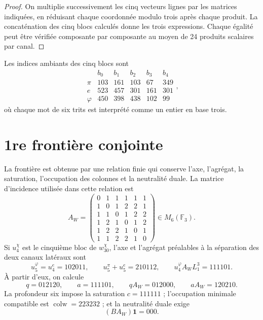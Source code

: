 \begin{proof}
On multiplie successivement les cinq vecteurs lignes par les matrices
indiquées, en réduisant chaque coordonnée modulo trois après chaque produit.
La concaténation des cinq blocs calculés donne les trois expressions.
Chaque égalité peut être vérifiée composante par composante au moyen de 24
produits scalaires par canal.
\end{proof}

Les indices ambiants des cinq blocs sont
\[
\begin{array}{c|rrrrr}
&b_0&b_1&b_2&b_3&b_4\\\hline
\pi&103&161&103&67&349\\
e&523&457&301&161&301\\
\varphi&450&398&438&102&99
\end{array},
\]
où chaque mot de six trits est interprété comme un entier en base trois.

\section{1re frontière conjointe}

La frontière est obtenue par une relation finie qui conserve l'axe, l'agrégat,
la saturation, l'occupation des colonnes et la neutralité duale. La matrice d'incidence
utilisée dans cette relation est
\begin{equation}
 A_W=
 \begin{pmatrix}
 0&1&1&1&1&1\\
 1&0&1&2&2&1\\
 1&1&0&1&2&2\\
 1&2&1&0&1&2\\
 1&2&2&1&0&1\\
 1&1&2&2&1&0
 \end{pmatrix}\in M_6(\mathbb F_3).
 \label{eq:u008-aw-frontera}
\end{equation}
Si \(u_4^\chi\) est le cinquième bloc de \(w_{30}^\chi\), l'axe et
l'agrégat préalables à la séparation des deux canaux latéraux sont
\begin{equation}
 u_5^\varphi=u_4^e=102011,
 \qquad
 u_5^\pi+u_5^e=210112,
 \qquad
 u_4^\varphi A_WL_1^3=111101.
 \label{eq:u008-eje-agregado-r36}
\end{equation}
À partir d'eux, on calcule
\begin{equation}
 q=012120,\qquad a=111101,\qquad
 qA_W=012000,\qquad aA_W=120210.
 \label{eq:u008-q-a-r36}
\end{equation}
La profondeur six impose la saturation \(c=111111\) ; l'occupation minimale
compatible est \(\operatorname{colw}=223232\) ; et la neutralité duale exige
\begin{equation}
 (BA_W)\mathbf1=000.
 \label{eq:u008-neutralidad-dual-r36}
\end{equation}

